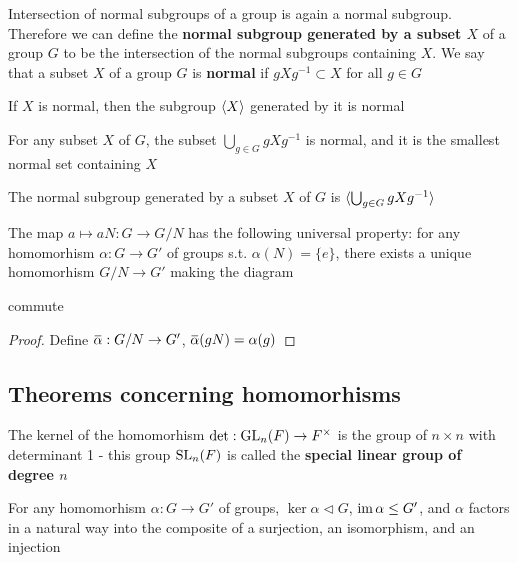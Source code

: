 \documentclass[11pt]{article}
\begin{document}
Intersection of normal subgroups of a group is again a normal subgroup. Therefore we can define
the \textbf{normal subgroup generated by a subset \(X\)} of a group \(G\) to be the intersection of the
normal subgroups containing \(X\). We say that a subset \(X\) of a group \(G\) is \textbf{normal}
if \(gXg^{-1}\subset X\) for all \(g\in G\)

\begin{lemma}[]
If \(X\) is normal, then the subgroup \(\langle X\rangle\) generated by it is normal
\end{lemma}

\begin{lemma}[]
For any subset \(X\) of \(G\), the subset \(\bigcup_{g\in G}gXg^{-1}\) is normal, and it is the smallest
normal set containing \(X\)
\end{lemma}

\begin{proposition}[]
The normal subgroup generated by a subset \(X\) of \(G\) is \(\langle\bigcup_{g\in G}gXg^{-1}\rangle\)
\end{proposition}

\begin{proposition}[]
The map \(a\mapsto aN:G\to G/N\) has the following universal property: for any homomorhism \(\alpha:G\to G'\)
of groups s.t. \(\alpha(N)=\{e\}\), there exists a unique homomorhism \(G/N\to G'\) making the diagram
\begin{center}\end{center}
commute
\end{proposition}

\begin{proof}
Define \(\baralpha:G/N\to G'\), \(\baralpha(gN)=\alpha(g)\)
\end{proof}
\subsection{Theorems concerning homomorhisms}
\label{sec:org18565b1}
The kernel of the homomorhism \(\det:\operatorname{GL}_n(F)\to F^{\times}\) is the group of \(n\times n\) with determinant
1 - this group \(\operatorname{SL}_n(F)\) is called the \textbf{special linear group of degree \(n\)}

\begin{theorem}
For any homomorhism \(\alpha:G\to G'\) of groups, \(\ker\alpha\lhd G\), \(\operatorname{im}\alpha\le G'\), and \(\alpha\) factors in a
natural way into the composite of a surjection, an isomorphism, and an injection
\begin{center}\end{center}
\end{theorem}
\end{document}
